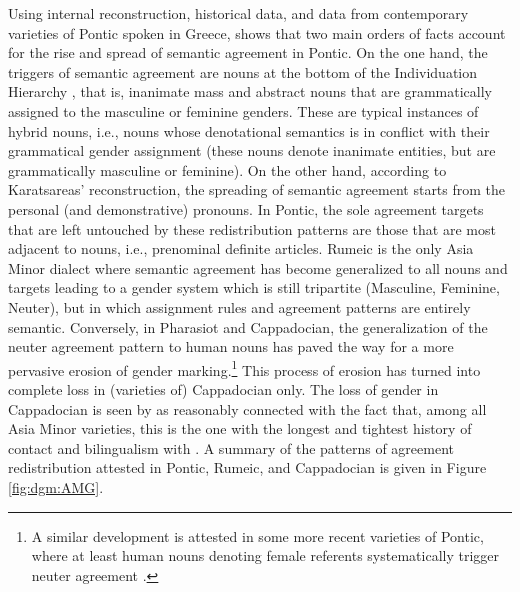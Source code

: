 \documentclass[output=collectionpaper]{langsci/langscibook}
\begin{document}
Using internal reconstruction, historical data, and data from contemporary varieties of Pontic spoken in Greece, \citet{Karatsareas2014} shows that two main orders of facts account for the rise and spread of semantic agreement in Pontic. On the one hand, the triggers of semantic agreement are nouns at the bottom of the Individuation Hierarchy \citep{Sasse1993}, that is, inanimate mass and abstract nouns that are grammatically assigned to the masculine or feminine genders. These are typical instances of hybrid nouns, i.e., nouns whose denotational semantics is in conflict with their grammatical gender assignment (these nouns denote inanimate entities, but are grammatically masculine or feminine).  On the other hand, according to Karatsareas' reconstruction, the spreading of semantic agreement starts from the personal (and demonstrative) pronouns. In Pontic, the sole agreement targets that are left untouched by these redistribution patterns are those that are most adjacent to nouns, i.e., prenominal definite articles. Rumeic is the only Asia Minor  dialect where semantic agreement has become generalized to all nouns and targets leading to a gender system which is still tripartite (Masculine, Feminine, Neuter), but in which assignment rules and agreement patterns are entirely semantic. Conversely, in Pharasiot and Cappadocian, the generalization of the neuter agreement pattern to human nouns has paved the way for a more pervasive erosion of gender marking.\footnote{A similar development is attested in some more recent varieties of Pontic, where at least human nouns denoting female referents systematically trigger neuter agreement \citep[96--97]{Karatsareas2014}. } This process of erosion has turned into complete loss in (varieties of) Cappadocian only. The loss of gender in Cappadocian  is seen by \citet[99]{Karatsareas2014} as reasonably connected with the fact that, among all Asia Minor  varieties, this is the one with the longest and tightest history of contact and bilingualism with . A summary of the patterns of agreement redistribution attested in Pontic, Rumeic, and Cappadocian  is given in Figure \ref{fig:dgm:AMG}.
\end{document}

